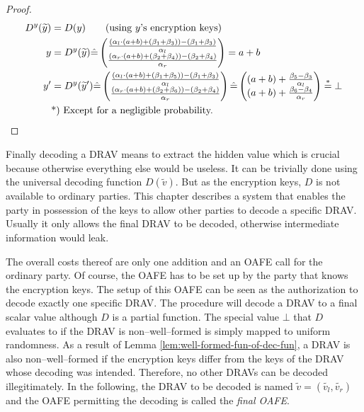 \begin{proof}
  \begin{align*}
    D^y(\widetilde{y}) &= D(y) \qquad\text{(using $y$'s encryption keys)}\\
    y &= D^y(\widetilde{y}) \hat{=}
    \begin{pmatrix}
      \frac{(\alpha_l \cdot (a+b) + (\beta_1 + \beta_3)) - (\beta_1+\beta_3)}
           {\alpha_l}\\
      \frac{(\alpha_r \cdot (a+b) + (\beta_2 + \beta_4)) - (\beta_2+\beta_4)}
           {\alpha_r}\\
    \end{pmatrix}
    = a+b\\
    y' &= D^y(\widetilde{y}')
    \hat{=}
    \begin{pmatrix}
      \frac{(\alpha_l \cdot (a+b) + (\beta_1 + \beta_5)) - (\beta_1+\beta_3)}
           {\alpha_l}\\
      \frac{(\alpha_r \cdot (a+b) + (\beta_2 + \beta_6)) - (\beta_2+\beta_4)}
           {\alpha_r}\\
    \end{pmatrix}
    \hat{=}
    \begin{pmatrix}
      (a+b) +
      \frac{\beta_5 - \beta_3}{\alpha_l}\\
      (a+b) +
      \frac{\beta_6 - \beta_4}{\alpha_r}\\
    \end{pmatrix}
    \stackrel{*}{=} \bot\\
    &\text{*) Except for a negligible probability.}{}
  \end{align*}
\end{proof}


\label{sec:drav-final-decoding}

Finally decoding a DRAV means to extract the hidden value which is crucial
because otherwise everything else would be useless. It can be trivially done
using the universal decoding function $D(\widetilde{v})$. But as the encryption
keys, $D$ is not available to ordinary parties. This chapter describes a system
that enables the party in possession of the keys to allow other parties to
decode a specific DRAV. Usually it only allows the final DRAV to be decoded,
otherwise intermediate information would leak.

The overall costs thereof are only one addition and an OAFE call for the
ordinary party. Of course, the OAFE has to be set up by the party that knows the
encryption keys. The setup of this OAFE can be seen as the authorization to
decode exactly one specific DRAV. The procedure will decode a DRAV to a final
scalar value although $D$ is a partial function. The special value $\bot$ that
$D$ evaluates to if the DRAV is non--well--formed is simply mapped to uniform
randomness. As a result of Lemma \ref{lem:well-formed-fun-of-dec-fun}, a DRAV is
also non--well--formed if the encryption keys differ from the keys of the DRAV
whose decoding was intended. Therefore, no other DRAVs can be decoded
illegitimately. In the following, the DRAV to be decoded is named $\widetilde{v}
= (\widetilde{v_l}, \widetilde{v_r})$ and the OAFE permitting the decoding is
called the \emph{final OAFE}.


